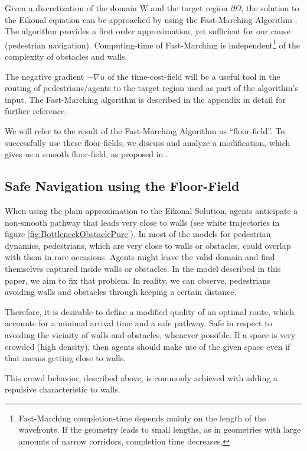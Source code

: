 Given a discretization of the domain \textgreek{W} and the target region ${\partial\Omega}$, the solution to the Eikonal equation can be approached by using the Fast-Marching Algorithm \citep{sethian}. The algorithm provides a first order approximation, yet sufficient for our cause (pedestrian navigation). Computing-time of Fast-Marching is independent\footnote{Fast-Marching completion-time depends mainly on the length of the wavefronts. If the geometry leads to small lengths, as in geometries with large amounts of narrow corridors, completion time decreases.} of the complexity of obstacles and walls. 

The negative gradient $-\nabla u$  of the time-cost-field will be a useful tool in the routing of pedestrians/agents to the target region used as part of the algorithm's input. The Fast-Marching algorithm is described in the appendix in detail for further reference.

We will refer to the result of the Fast-Marching Algorithm as ``floor-field''. To successfully use these floor-fields, we discuss and analyze a modification, which gives us a smooth floor-field, as proposed in \citep{Madrid}.

\subsection{Safe Navigation using the Floor-Field}

When using the plain approximation to the Eikonal Solution, agents anticipate a non-smooth pathway that leads very close to 
walls (see white trajectories in figure \ref{fig:BottleneckObstaclePure}). In most of the models for pedestrian dynamics, pedestrians, which are very close to walls or obstacles, could overlap with them in rare occasions. Agents might leave the valid domain and find themselves captured inside walls or obstacles. In the model described in this paper, we aim to fix that
problem. In reality, we can observe, pedestrians avoiding walls and obstacles through keeping a certain distance. 

Therefore, it is desirable to define a modified quality of an optimal route, which accounts for a minimal arrival time and a safe pathway. Safe in respect to avoiding the vicinity of walls and obstacles, whenever possible. If a space is very crowded (high density), then agents should make use of the given space even if that means getting close to walls.

This crowd behavior, described above, is commonly achieved with adding a repulsive characteristic to walls.

